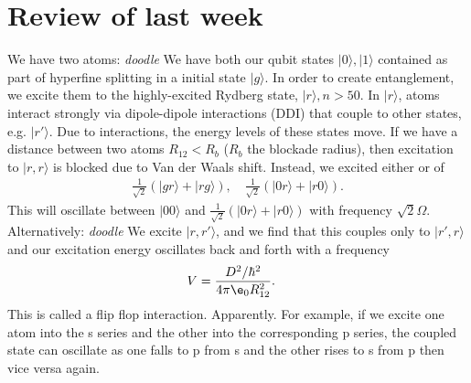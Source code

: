 \documentclass[a4paper, 11pt, normalem]{report}
\begin{document}
\section{Review of last week}
We have two atoms:
\emph{doodle}
We have both our qubit states $|0\rangle,|1\rangle$ contained as part of hyperfine splitting in a initial state $|g\rangle$.
In order to create entanglement, we excite them to the highly-excited Rydberg state, $|r\rangle,n>50$.
In $|r\rangle$, atoms interact strongly via dipole-dipole interactions (DDI) that couple to other states, e.g. $|r'\rangle$.
Due to interactions, the energy levels of these states move.
If we have a distance between two atoms $R_{12}<R_b$ ($R_b$ the blockade radius), then excitation to $|r,r\rangle$ is blocked due to Van der Waals shift.
Instead, we excited either or of
\begin{align*}
    \frac{1}{\sqrt{2}}\left(|gr\rangle+|rg\rangle\right),\quad \frac{1}{\sqrt{2}}\left(|0r\rangle+|r0\rangle\right).
\end{align*}
This will oscillate between $|00\rangle$ and $\frac{1}{\sqrt{2}}\left(|0r\rangle+|r0\rangle\right)$ with frequency $\sqrt{2}\Omega$.
Alternatively:
\emph{doodle}
We excite $|r,r'\rangle$, and we find that this couples only to $|r',r\rangle$ and our excitation energy oscillates back and forth with a frequency
\begin{align}
    V &= \frac{D^2/\hbar^2}{4\pi\e_0 R_{12}^2}.
\end{align}
This is called a flip flop interaction. Apparently.
For example, if we excite one atom into the s series and the other into the corresponding p series, the coupled state can oscillate as one falls to p from s and the other rises to s from p then vice versa again.
\end{document}
